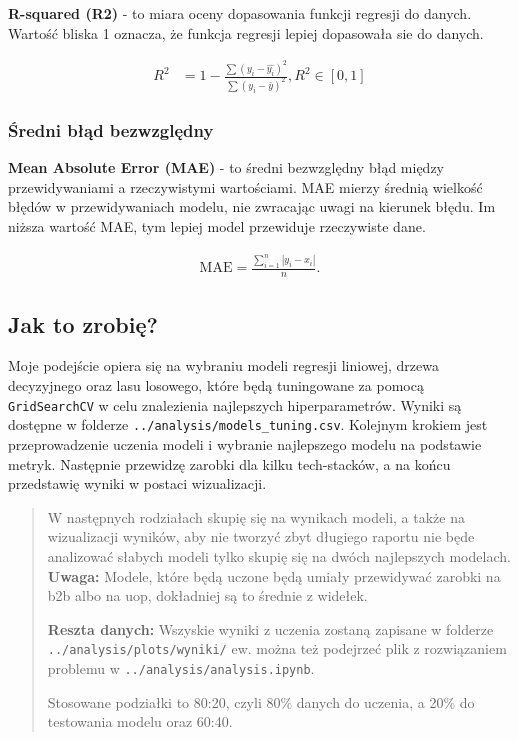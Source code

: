 \documentclass[a4paper]{article}
\begin{document}
\quad \textbf{R-squared (R2)} - to miara oceny dopasowania funkcji regresji do danych. Wartość bliska 1 oznacza, że funkcja regresji lepiej dopasowała sie do danych.

\begin{align} R^2&=1-\frac{\sum({y_i}-\hat{y_i})^2}{\sum(y_i-\bar{y})^2}, R^2 \in [0, 1] \end{align}

\subsubsection{Średni błąd bezwzględny}

\quad \textbf{Mean Absolute Error (MAE)} - to średni bezwzględny błąd między przewidywaniami a rzeczywistymi wartościami. MAE mierzy średnią wielkość błędów w przewidywaniach modelu, nie zwracając uwagi na kierunek błędu. Im niższa wartość MAE, tym lepiej model przewiduje rzeczywiste dane.

\begin{align}
    {\displaystyle \mathrm {MAE} ={\frac {\sum _{i=1}^{n}\left|y_{i}-x_{i}\right|}{n}}.}
\end{align}


\subsection{Jak to zrobię?}

\quad Moje podejście opiera się na wybraniu modeli regresji liniowej, drzewa decyzyjnego oraz lasu losowego, które będą
tuningowane za pomocą \texttt{GridSearchCV} w celu znalezienia najlepszych hiperparametrów. Wyniki są dostępne w folderze
\texttt{../analysis/models\_tuning.csv}. Kolejnym krokiem jest przeprowadzenie uczenia modeli i wybranie najlepszego modelu
na podstawie metryk. Następnie przewidzę zarobki dla kilku tech-stacków, a na końcu przedstawię wyniki w postaci wizualizacji.

\begin{abstract}
    \quad W następnych rodziałach skupię się na wynikach modeli, a także na wizualizacji wyników, aby nie
    tworzyć zbyt długiego raportu nie będe analizować słabych modeli tylko skupię się na dwóch najlepszych modelach.
    \textbf{Uwaga: } Modele, które będą uczone będą umiały przewidywać zarobki na b2b albo na uop, dokładniej są to średnie z widełek.

    \textbf{Reszta danych: } Wszyskie wyniki z uczenia zostaną zapisane w folderze \texttt{../analysis/plots/wyniki/} ew. można też
    podejrzeć plik z rozwiązaniem problemu w \texttt{../analysis/analysis.ipynb}.

    \quad Stosowane podziałki to 80:20, czyli 80\% danych do uczenia, a 20\% do testowania modelu oraz 60:40.
\end{abstract}
\end{document}
